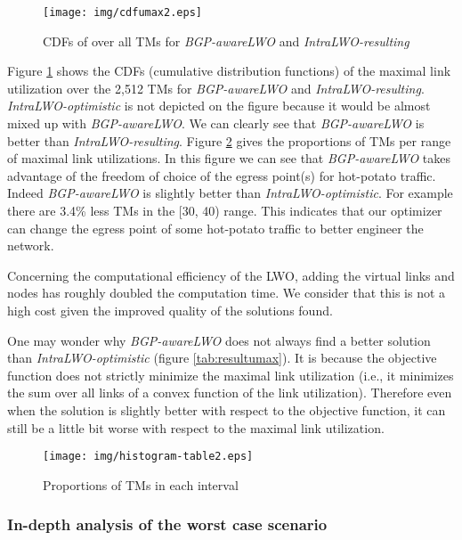 \documentclass{acm_proc_article-sp}
\begin{document}
\begin{figure}[htbp]
  \centering
  \texttt{[image: img/cdfumax2.eps]}
  \caption{CDFs of  over all TMs  for \textit{BGP-awareLWO} and \textit{IntraLWO-resulting}}
  \label{fig:umax}
\end{figure}


Figure \ref{fig:umax} shows the CDFs (cumulative distribution functions) of the maximal link utilization over the 2,512 TMs
for \textit{BGP-awareLWO} and
\textit{IntraLWO-resulting}. \textit{IntraLWO-optimistic} is not
depicted on the figure because it would be almost mixed up with \textit{BGP-awareLWO}.
We can clearly see 
that \textit{BGP-awareLWO} is better than \textit{IntraLWO-resulting}. 
Figure \ref{tab:resultumax2} gives the proportions of TMs per range of maximal link utilizations.
In this figure we can see that \textit{BGP-awareLWO} takes advantage of
the freedom of choice of the egress point(s) for hot-potato traffic. Indeed 
\textit{BGP-awareLWO} is slightly better than \textit{IntraLWO-optimistic}.
For example there are 3.4\% less TMs in the [30, 40)
range. This indicates that our optimizer can 
change the egress point of some hot-potato traffic to better engineer
the network. 

Concerning the computational efficiency of the LWO,
adding the virtual links and nodes has roughly doubled the computation
time. We consider that this is not a high cost given the improved quality
of the solutions found.

One may wonder why \textit{BGP-awareLWO} does not always find a
better solution than \textit{IntraLWO-optimistic} (figure  
\ref{tab:resultumax}). It is because the objective
function does not strictly minimize the maximal link utilization 
(i.e., it minimizes the sum over all links of a convex function of the link utilization). 
Therefore even when the solution is slightly better with respect to the objective
function, it can still be a little bit worse with respect to the maximal link utilization.


\begin{figure}[htbp]
  \centering
  \texttt{[image: img/histogram-table2.eps]}
  \caption{Proportions of TMs in each  interval}
  \label{tab:resultumax2}
\end{figure}


\subsubsection{In-depth analysis of the worst case scenario}
\end{document}
